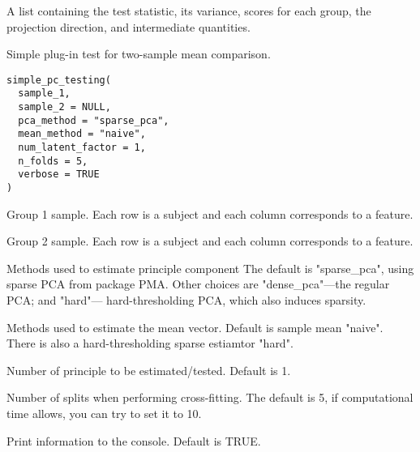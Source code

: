 \documentclass[a4paper]{book}
\begin{document}
%
\begin{Value}
A list containing the test statistic, its variance, scores for each group, the projection direction, and intermediate quantities.
\end{Value}
%
\begin{Description}
Simple plug-in test for two-sample mean comparison.
\end{Description}
%
\begin{Usage}
\begin{verbatim}
simple_pc_testing(
  sample_1,
  sample_2 = NULL,
  pca_method = "sparse_pca",
  mean_method = "naive",
  num_latent_factor = 1,
  n_folds = 5,
  verbose = TRUE
)
\end{verbatim}
\end{Usage}
%
\begin{Arguments}
\begin{ldescription}
\item[\code{sample\_1}] Group 1 sample. Each row is a subject and each column corresponds to a feature.

\item[\code{sample\_2}] Group 2 sample. Each row is a subject and each column corresponds to a feature.

\item[\code{pca\_method}] Methods used to estimate principle component The default is "sparse\_pca", using sparse PCA from package PMA. Other choices are "dense\_pca"---the regular PCA; and "hard"--- hard-thresholding PCA, which also induces sparsity.

\item[\code{mean\_method}] Methods used to estimate the mean vector. Default is sample mean "naive". There is also a hard-thresholding sparse estiamtor "hard".

\item[\code{num\_latent\_factor}] Number of principle to be estimated/tested. Default is 1.

\item[\code{n\_folds}] Number of splits when performing cross-fitting. The default is 5, if computational time allows, you can try to set it to 10.

\item[\code{verbose}] Print information to the console. Default is TRUE.
\end{ldescription}
\end{Arguments}
%
\end{document}
